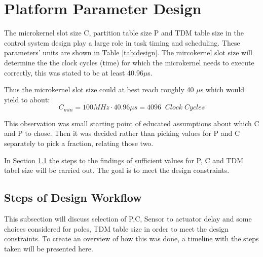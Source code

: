 \section{Platform Parameter Design}
\label{sec:platform}

The microkernel slot size C, partition table size P and TDM table size in the control system design play a large role in task timing and scheduling. These parameters' units are shown in Table \ref{tab:design}. The mircokernel slot size will determine the the clock cycles (time) for which the microkernel needs to execute correctly, this was stated to be at least 40.96$\mu$s.

Thus the microkernel slot size could at best reach roughly 40 $\mu$s which would yield to about: $$ C_{min} = 100MHz \cdot 40.96 \mu s = 4096 \;\;Clock \; Cycles$$

This observation was small starting point of educated assumptions about which C and P to chose. Then it was decided rather than picking values for P and C separately to pick a fraction, relating those two. 

In Section \ref{sec:steps} the steps to the findings of sufficient values for P, C and TDM tabel size will be carried out. The goal is to meet the design constraints.

\subsection{Steps of Design Workflow}
\label{sec:steps}
This subsection will discuss selection of P,C, Sensor to actuator delay and some choices considered for poles, TDM table size in order to meet the design constraints. To create an overview of how this was done, a timeline with the steps taken will be presented here.

